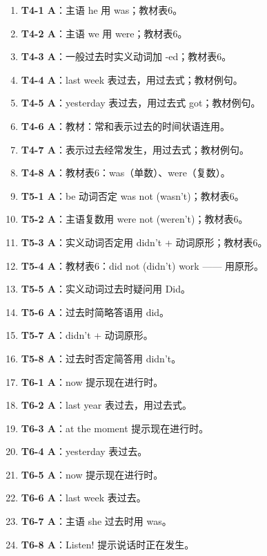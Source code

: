 \documentclass[11pt,a4paper]{ctexart}
\begin{document}
\begin{enumerate}[leftmargin=1.6em,itemsep=2pt]
\item \textbf{T4-1 A}：主语 he 用 was；教材表6。
\item \textbf{T4-2 A}：主语 we 用 were；教材表6。
\item \textbf{T4-3 A}：一般过去时实义动词加 -ed；教材表6。
\item \textbf{T4-4 A}：last week 表过去，用过去式；教材例句。
\item \textbf{T4-5 A}：yesterday 表过去，用过去式 got；教材例句。
\item \textbf{T4-6 A}：教材：常和表示过去的时间状语连用。
\item \textbf{T4-7 A}：表示过去经常发生，用过去式；教材例句。
\item \textbf{T4-8 A}：教材表6：was（单数）、were（复数）。
\item \textbf{T5-1 A}：be 动词否定 was not (wasn’t)；教材表6。
\item \textbf{T5-2 A}：主语复数用 were not (weren’t)；教材表6。
\item \textbf{T5-3 A}：实义动词否定用 didn’t + 动词原形；教材表6。
\item \textbf{T5-4 A}：教材表6：did not (didn’t) work —— 用原形。
\item \textbf{T5-5 A}：实义动词过去时疑问用 Did。
\item \textbf{T5-6 A}：过去时简略答语用 did。
\item \textbf{T5-7 A}：didn’t + 动词原形。
\item \textbf{T5-8 A}：过去时否定简答用 didn’t。
\item \textbf{T6-1 A}：now 提示现在进行时。
\item \textbf{T6-2 A}：last year 表过去，用过去式。
\item \textbf{T6-3 A}：at the moment 提示现在进行时。
\item \textbf{T6-4 A}：yesterday 表过去。
\item \textbf{T6-5 A}：now 提示现在进行时。
\item \textbf{T6-6 A}：last week 表过去。
\item \textbf{T6-7 A}：主语 she 过去时用 was。
\item \textbf{T6-8 A}：Listen! 提示说话时正在发生。
\end{enumerate}
\end{document}
